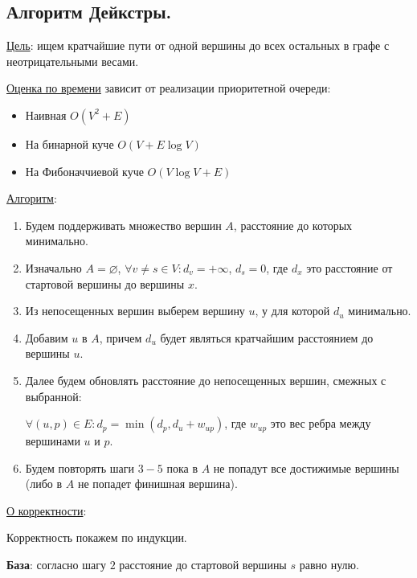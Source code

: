\subsection{%
  Алгоритм Дейкстры.%
}

\underline{Цель}: ищем кратчайшие пути от одной вершины до всех остальных
в графе с неотрицательными весами.

\underline{Оценка по времени} зависит от реализации приоритетной очереди:
\begin{itemize}
  \item Наивная \(O(V^2 + E)\)
  \item На бинарной куче \(O(V + E \log V)\)
  \item На Фибоначчиевой куче \(O(V \log V + E)\)
\end{itemize}

\underline{Алгоритм}:
\begin{enumerate}
  \item Будем поддерживать множество вершин \(A\), расстояние до которых
  минимально.

  \item Изначально
  \(A = \varnothing\),
  \(\forall v \neq s \in V \colon d_{v} = +\infty\),
  \(d_{s} = 0\),
  где \(d_{x}\) это расстояние от стартовой вершины до вершины \(x\).

  \item Из непосещенных вершин выберем вершину \(u\), у для которой \(d_{u}\)
  минимально.
  
  \item Добавим \(u\) в \(A\), причем \(d_{u}\) будет являться кратчайшим
  расстоянием до вершины \(u\).

  \item Далее будем обновлять расстояние до непосещенных вершин, смежных с
  выбранной:
  
  \(
    \forall (u, p) \in E \colon
    d_{p} = \min(d_{p}, d_{u} + w_{up})
  \), где \(w_{up}\) это вес ребра между вершинами \(u\) и \(p\).

  \item Будем повторять шаги \(3-5\) пока в \(A\) не попадут все достижимые
  вершины (либо в \(A\) не попадет финишная вершина).
\end{enumerate}

\underline{О корректности}:

Корректность покажем по индукции.

\textbf{База}: согласно шагу \(2\) расстояние до стартовой вершины \(s\) равно
нулю.

